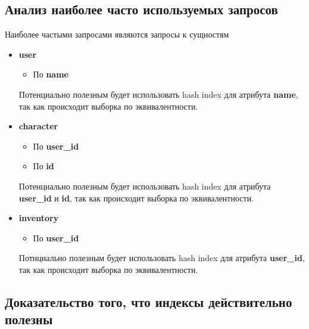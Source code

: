\newpage

\subsection*{Анализ наиболее часто используемых запросов}


Наиболее частыми запросами являются запросы к сущностям 
\begin{itemize}
    \item \textbf{user}
    \begin{itemize}
        \item По \textbf{name}
    \end{itemize}
    Потенциально полезным будет использовать hash index для атрибута \textbf{name}, так как происходит выборка по эквивалентности.
    
    \item \textbf{character}
    \begin{itemize}
        \item По \textbf{user\_id}
        \item По \textbf{id}
    \end{itemize}

    Потенциально полезным будет использовать hash index для атрибута \textbf{user\_id} и \textbf{id}, так как происходит выборка по эквивалентности.

    \item \textbf{inventory}
    \begin{itemize}
        \item По \textbf{user\_id}
    \end{itemize}

    Потнциально полезным будет использовать hash index для атрибута \textbf{user\_id}, так как происходит выборка по эквивалентности.
\end{itemize}

\newpage

\subsection*{Доказательство того, что индексы действительно полезны}


